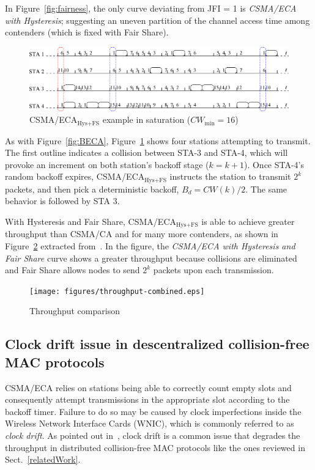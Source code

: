 \documentclass[a4paper,journal]{IEEEtran}
\begin{document}
	In Figure~\ref{fig:fairness}, the only curve deviating from JFI = 1 is \emph{CSMA/ECA with Hysteresis}; suggesting an uneven partition of the channel access time among contenders (which is fixed with Fair Share).
	
	\begin{figure}[tb]
	\centering
		\includegraphics[width=0.8\linewidth]{figures/csma_eca_different_backoff_short.eps}
		\caption{CSMA/ECA$_{\text{Hys+FS}}$ example in saturation ($CW_{\min}=16$)}
		\label{fig:ECA+Hyst}
	\end{figure}
	
	As with Figure~\ref{fig:BECA}, Figure~\ref{fig:ECA+Hyst} shows four stations attempting to transmit. The first outline indicates a collision between STA-3 and STA-4, which will provoke an increment on both station's backoff stage ($k=k+1$). Once STA-4's random backoff expires, CSMA/ECA$_{\text{Hys+FS}}$ instructs the station to transmit $2^{k}$ packets, and then pick a deterministic backoff, $B_{d}=CW(k)/2$. The same behavior is followed by STA 3.
	
	With Hysteresis and Fair Share, CSMA/ECA$_{\text{Hys+FS}}$ is able to achieve greater throughput than CSMA/CA and for many more contenders, as shown in Figure~\ref{fig:ECA+H+F-throughput} extracted from~\cite{research2standards}. In the figure, the \emph{CSMA/ECA with Hysteresis and Fair Share} curve shows a greater throughput because collisions are eliminated and Fair Share allows nodes to send $2^{k}$ packets upon each transmission.

	\begin{figure}[tb]
	\centering
		\texttt{[image: figures/throughput-combined.eps]}
		\caption{Throughput comparison~\cite{research2standards}}
		\label{fig:ECA+H+F-throughput}
	\end{figure}
	
	\subsection{Clock drift issue in descentralized collision-free MAC protocols}\label{clockDrift-issue}
	CSMA/ECA relies on stations being able to correctly count empty slots and consequently attempt transmissions in the appropriate slot according to the backoff timer. Failure to do so may be caused by clock imperfections inside the Wireless Network Interface Cards (WNIC), which is commonly referred to as \emph{clock drift}. As pointed out in~\cite{slotDrift}, clock drift is a common issue that degrades the throughput in distributed collision-free MAC protocols like the ones reviewed in Sect.~\ref{relatedWork}.
	
\end{document}
